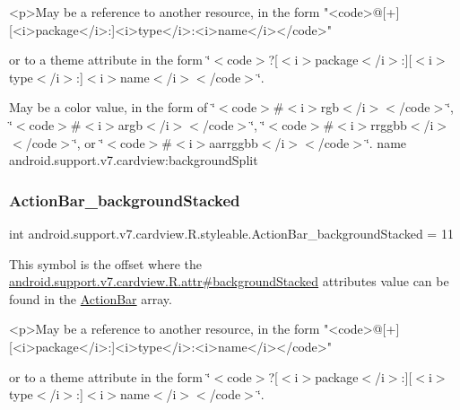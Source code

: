 \begin{DoxyVerb}      <p>May be a reference to another resource, in the form "<code>@[+][<i>package</i>:]<i>type</i>:<i>name</i></code>"
\end{DoxyVerb}
 or to a theme attribute in the form \char`\"{}$<$code$>$?\mbox{[}$<$i$>$package$<$/i$>$\+:\mbox{]}\mbox{[}$<$i$>$type$<$/i$>$\+:\mbox{]}$<$i$>$name$<$/i$>$$<$/code$>$\char`\"{}. 

May be a color value, in the form of \char`\"{}$<$code$>$\#$<$i$>$rgb$<$/i$>$$<$/code$>$\char`\"{}, \char`\"{}$<$code$>$\#$<$i$>$argb$<$/i$>$$<$/code$>$\char`\"{}, \char`\"{}$<$code$>$\#$<$i$>$rrggbb$<$/i$>$$<$/code$>$\char`\"{}, or \char`\"{}$<$code$>$\#$<$i$>$aarrggbb$<$/i$>$$<$/code$>$\char`\"{}.  name android.\+support.\+v7.\+cardview\+:background\+Split \mbox{\label{classandroid_1_1support_1_1v7_1_1cardview_1_1R_1_1styleable_ae8cef0aa1d4b10f1ae6ef92ca895778d}} 
\subsubsection{\texorpdfstring{Action\+Bar\+\_\+background\+Stacked}{ActionBar\_backgroundStacked}}
{\footnotesize\ttfamily int android.\+support.\+v7.\+cardview.\+R.\+styleable.\+Action\+Bar\+\_\+background\+Stacked = 11\hspace{0.3cm}{\ttfamily [static]}}

This symbol is the offset where the \hyperlink{classandroid_1_1support_1_1v7_1_1cardview_1_1R_1_1attr_a391ae99ec962c0c68e929d5171bf5468}{android.\+support.\+v7.\+cardview.\+R.\+attr\#background\+Stacked} attribute\textquotesingle{}s value can be found in the \hyperlink{classandroid_1_1support_1_1v7_1_1cardview_1_1R_1_1styleable_a0cbf7f776e31f78bb0a2b558daf176f8}{Action\+Bar} array.

\begin{DoxyVerb}      <p>May be a reference to another resource, in the form "<code>@[+][<i>package</i>:]<i>type</i>:<i>name</i></code>"
\end{DoxyVerb}
 or to a theme attribute in the form \char`\"{}$<$code$>$?\mbox{[}$<$i$>$package$<$/i$>$\+:\mbox{]}\mbox{[}$<$i$>$type$<$/i$>$\+:\mbox{]}$<$i$>$name$<$/i$>$$<$/code$>$\char`\"{}. 


